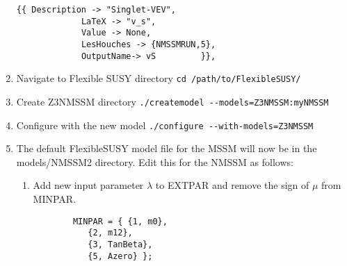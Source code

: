 \documentclass[final,3p,11pt,pdflatex]{elsarticle}
\newcommand{\code}[1]{\lstinline|#1|}  %
\begin{document}
\begin{enumerate}
\begin{lstlisting}
{{ Description -> "Singlet-VEV", 
			 LaTeX -> "v_s",
             Value -> None, 
             LesHouches -> {NMSSMRUN,5},
             OutputName-> vS         }},
\end{lstlisting}
\item Navigate to Flexible SUSY directory  \code{cd /path/to/FlexibleSUSY/}
\item Create Z3NMSSM directory \code{./createmodel --models=Z3NMSSM:myNMSSM}
\item Configure with the new model \code{./configure --with-models=Z3NMSSM}
\item The default FlexibleSUSY model file for the MSSM will now be in the models/NMSSM2 directory.  Edit this for the NMSSM as follows:
  \begin{enumerate} 
    \item Add new input parameter $\lambda$ to EXTPAR and remove the sign of $\mu$ from MINPAR.
      \begin{lstlisting}    
        MINPAR = { {1, m0},
           {2, m12},
           {3, TanBeta},
           {5, Azero} };


\end{lstlisting}
\end{enumerate}
\end{enumerate}
\end{document}
